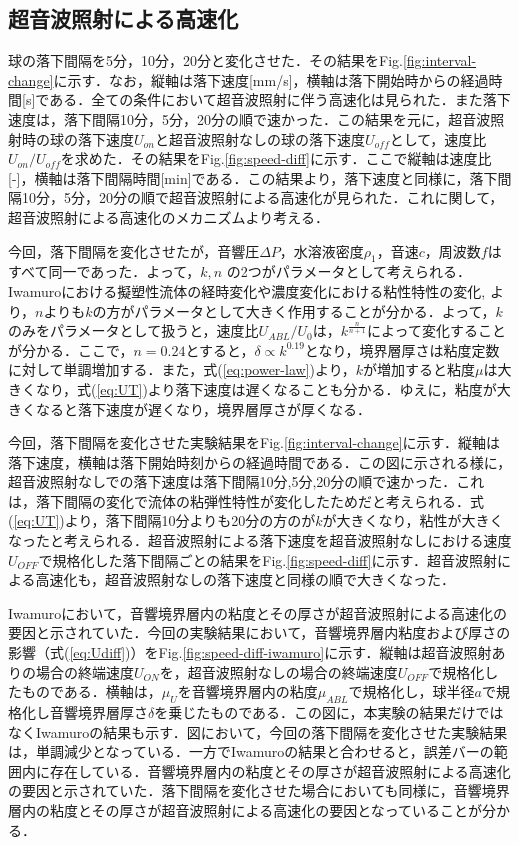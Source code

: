 \clearpage

\subsection{超音波照射による高速化}

球の落下間隔を5分，10分，20分と変化させた．その結果をFig.\ref{fig:interval-change}に示す．なお，縦軸は落下速度[mm/s]，横軸は落下開始時からの経過時間[s]である．全ての条件において超音波照射に伴う高速化は見られた．また落下速度は，落下間隔10分，5分，20分の順で速かった．この結果を元に，超音波照射時の球の落下速度$U_{on}$と超音波照射なしの球の落下速度$U_{off}$として，速度比$U_{on}/U_{off}$を求めた．その結果をFig.\ref{fig:speed-diff}に示す．ここで縦軸は速度比[-]，横軸は落下間隔時間[min]である．この結果より，落下速度と同様に，落下間隔10分，5分，20分の順で超音波照射による高速化が見られた．これに関して，超音波照射による高速化のメカニズムより考える．

今回，落下間隔を変化させたが，音響圧$\Delta P$，水溶液密度$\rho_1$，音速$c$，周波数$f$はすべて同一であった．よって，$k,n$ の2つがパラメータとして考えられる．Iwamuro\cite{ref:9}における擬塑性流体の経時変化や濃度変化における粘性特性の変化\cite{ref:Rahimi2007},\cite{ref:Agi2018} より，$n$よりも$k$の方がパラメータとして大きく作用することが分かる．よって，$k$のみをパラメータとして扱うと，速度比$U_{ABL}/U_0$は，$k^\frac{n}{n+1}$によって変化することが分かる．ここで，$n=0.24$とすると，$\delta \propto k^{0.19}$となり，境界層厚さは粘度定数に対して単調増加する．また，式(\ref{eq:power-law})より，$k$が増加すると粘度$\mu$は大きくなり，式(\ref{eq:UT})より落下速度は遅くなることも分かる．ゆえに，粘度が大きくなると落下速度が遅くなり，境界層厚さが厚くなる．

今回，落下間隔を変化させた実験結果をFig.\ref{fig:interval-change}に示す．縦軸は落下速度，横軸は落下開始時刻からの経過時間である．この図に示される様に，超音波照射なしでの落下速度は落下間隔10分,5分,20分の順で速かった．これは，落下間隔の変化で流体の粘弾性特性が変化したためだと考えられる．式(\ref{eq:UT})より，落下間隔10分よりも20分の方のが$k$が大きくなり，粘性が大きくなったと考えられる．超音波照射による落下速度を超音波照射なしにおける速度$U_{OFF}$で規格化した落下間隔ごとの結果をFig.\ref{fig:speed-diff}に示す．超音波照射による高速化も，超音波照射なしの落下速度と同様の順で大きくなった．

Iwamuro\cite{ref:8}において，音響境界層内の粘度とその厚さが超音波照射による高速化の要因と示されていた．今回の実験結果において，音響境界層内粘度および厚さの影響（式(\ref{eq:Udiff})）をFig.\ref{fig:speed-diff-iwamuro}に示す．縦軸は超音波照射ありの場合の終端速度$U_{ON}$を，超音波照射なしの場合の終端速度$U_{OFF}$で規格化したものである．横軸は，$\mu_U$を音響境界層内の粘度$\mu_{ABL}$で規格化し，球半径$a$で規格化し音響境界層厚さ$\delta$を乗じたものである．この図に，本実験の結果だけではなくIwamuro\cite{ref:8}の結果も示す．図において，今回の落下間隔を変化させた実験結果は，単調減少となっている．一方でIwamuro\cite{ref:8}の結果と合わせると，誤差バーの範囲内に存在している．音響境界層内の粘度とその厚さが超音波照射による高速化の要因と示されていた．落下間隔を変化させた場合においても同様に，音響境界層内の粘度とその厚さが超音波照射による高速化の要因となっていることが分かる．


